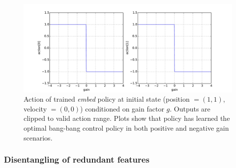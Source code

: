\documentclass{article}
\newcommand{\embed}{\emph{embed}}
\begin{document}
\begin{figure}
\centering
\includegraphics[width=0.85 \textwidth]{pointmass_conditional_action.pdf}
\caption{
Action of trained \embed{} policy at initial state (position $ = (1,1)$, velocity $=(0,0)$) conditioned on gain factor $g$.
Outputs are clipped to valid action range.
Plots show that policy has learned the optimal bang-bang control policy in both positive and negative gain scenarios.
}
\label{fig:conditional_action}
\end{figure}

\subsubsection{Disentangling of redundant features}
\end{document}
